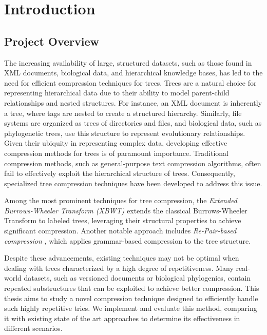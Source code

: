 \chapter{Introduction} \label{chp:introduction}
\section{Project Overview}
The increasing availability of large, structured datasets, such as those found in XML documents, biological data, and hierarchical knowledge bases, has led to the need for efficient compression techniques for trees.
Trees are a natural choice for representing hierarchical data due to their ability to model parent-child relationships and nested structures. For instance, an XML document is inherently a tree, where tags are nested to create a structured hierarchy. Similarly, file systems are organized as trees of directories and files, and biological data, such as phylogenetic trees, use this structure to represent evolutionary relationships. Given their ubiquity in representing complex data, developing effective compression methods for trees is of paramount importance.
Traditional compression methods, such as general-purpose text compression algorithms, often fail to effectively exploit the hierarchical structure of trees. Consequently, specialized tree compression techniques have been developed to address this issue.

Among the most prominent techniques for tree compression, the \textit{Extended Burrows-Wheeler Transform (XBWT)} \cite{ferragina2009compressing} extends the classical Burrows-Wheeler Transform to labeled trees, leveraging their structural properties to achieve significant compression. Another notable approach includes \textit{Re-Pair-based compression} \cite{lohrey2011tree}, which applies grammar-based compression to the tree structure. 

Despite these advancements, existing techniques may not be optimal when dealing with trees characterized by a high degree of repetitiveness. Many real-world datasets, such as versioned documents or biological phylogenies, contain repeated substructures that can be exploited to achieve better compression. This thesis aims to study a novel compression technique designed to efficiently handle such highly repetitive tries. We implement and evaluate this method, comparing it with existing state of the art approaches to determine its effectiveness in different scenarios.


